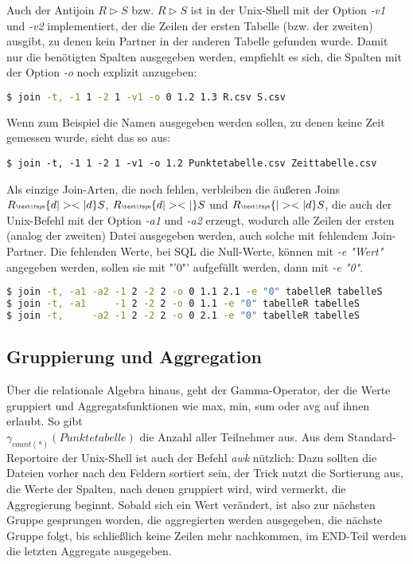 %
Auch der Antijoin $ R \vartriangleright S $ bzw. $ R \vartriangleright S$ ist in der Unix-Shell mit der Option \textit{-v1} und \textit{-v2} implementiert, der die Zeilen der ersten Tabelle (bzw. der zweiten) ausgibt, zu denen kein Partner in der anderen Tabelle gefunden wurde. Damit nur die benötigten Spalten ausgegeben werden, empfiehlt es sich, die Spalten mit der Option \textit{-o} noch explizit anzugeben:
\begin{lstlisting}[language=Bash]
$ join -t, -1 1 -2 1 -v1 -o 0 1.2 1.3 R.csv S.csv
\end{lstlisting}
Wenn zum Beispiel die Namen ausgegeben werden sollen, zu denen keine Zeit gemessen wurde, sieht das so aus:
\begin{lstlisting}
$ join -t, -1 1 -2 1 -v1 -o 1.2 Punktetabelle.csv Zeittabelle.csv
\end{lstlisting}

Als einzige Join-Arten, die noch fehlen, verbleiben die äußeren Joins
$R {\tiny \textifsym{d|><|d}} S $,
$R {\tiny \textifsym{d|><|}} S $ und
$R {\tiny \textifsym{|><|d}} S $,
die auch der Unix-Befehl mit der Option \textit{-a1} und \textit{-a2} erzeugt, wodurch alle Zeilen der ersten (analog der zweiten) Datei ausgegeben werden, auch solche mit fehlendem Join-Partner. Die fehlenden Werte, bei SQL die Null-Werte, können mit \textit{-e "Wert"} angegeben werden, sollen sie mit "'0"' aufgefüllt werden, dann mit \textit{-e "0"}.

\begin{lstlisting}[language=Bash]
$ join -t, -a1 -a2 -1 2 -2 2 -o 0 1.1 2.1 -e "0" tabelleR tabelleS
$ join -t, -a1     -1 2 -2 2 -o 0 1.1 -e "0" tabelleR tabelleS
$ join -t,     -a2 -1 2 -2 2 -o 0 2.1 -e "0" tabelleR tabelleS
\end{lstlisting}

\subsection{Gruppierung und Aggregation}
Über die relationale Algebra hinaus, geht der Gamma-Operator, der die Werte gruppiert und Aggregatsfunktionen wie max, min, sum oder avg auf ihnen erlaubt.
So gibt\\
$\gamma_{count(*)}(Punktetabelle)$
die Anzahl aller Teilnehmer aus. Aus dem Standard-Reportoire der Unix-Shell ist auch der Befehl \textit{awk} nützlich: Dazu sollten die Dateien vorher nach den Feldern sortiert sein, der Trick nutzt die Sortierung aus, die Werte der Spalten, nach denen gruppiert wird, wird vermerkt, die Aggregierung beginnt. Sobald sich ein Wert verändert, ist also zur nächsten Gruppe gesprungen worden, die aggregierten werden ausgegeben, die nächste Gruppe folgt, bis schließlich keine Zeilen mehr nachkommen, im END-Teil werden die letzten Aggregate ausgegeben.

